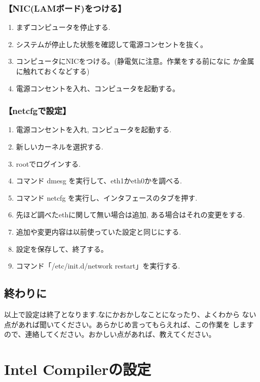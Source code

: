 \documentclass[a4paper,titlepage]{jreport}
\begin{document}
\subsubsection{【NIC(LAMボード)をつける】}

\begin{enumerate}
\item まずコンピュータを停止する.
\item システムが停止した状態を確認して電源コンセントを抜く。
\item コンピュータにNICをつける。(静電気に注意。作業をする前になに
      か金属に触れておくなどする)
\item 電源コンセントを入れ、コンピュータを起動する。
\end{enumerate}

\subsubsection{【netcfgで設定】}

\begin{enumerate}
\item 電源コンセントを入れ, コンピュータを起動する.
\item 新しいカーネルを選択する.
\item rootでログインする.
\item コマンド dmesg を実行して、eth1かeth0かを調べる.
\item コマンド netcfg を実行し、インタフェースのタブを押す.
\item 先ほど調べたethに関して無い場合は追加, ある場合はそれの変更をする.
\item 追加や変更内容は以前使っていた設定と同じにする.
\item 設定を保存して、終了する。
\item コマンド「/etc/init.d/network restart」を実行する.
\end{enumerate}

\subsection{終わりに}

以上で設定は終了となります.なにかおかしなことになったり、よくわから
ない点があれば聞いてください。あらかじめ言ってもらえれば、この作業を
しますので、連絡してください。おかしい点があれば、教えてください。

\section{Intel Compilerの設定}
\end{document}
